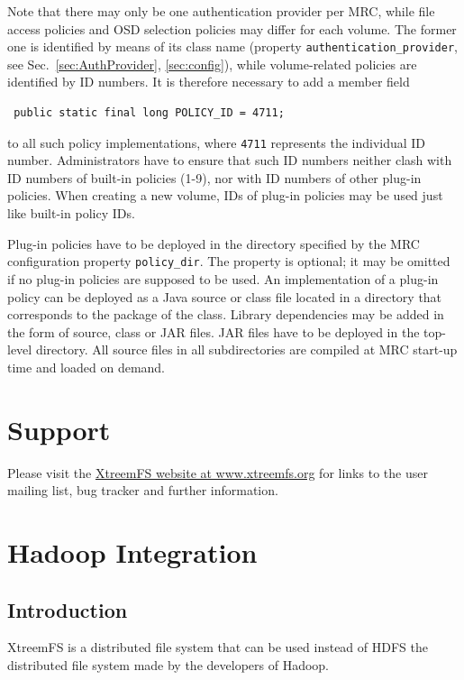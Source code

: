 \documentclass[a4paper,10pt]{book}
\begin{document}
Note that there may only be one authentication provider per MRC, while file access policies and OSD selection policies may differ for each volume. The former one is identified by means of its class name (property \texttt{authentication\_provider}, see Sec.\ \ref{sec:AuthProvider}, \ref{sec:config}), while volume-related policies are identified by ID numbers. It is therefore necessary to add a member field

\begin{verbatim}
 public static final long POLICY_ID = 4711;
\end{verbatim}

to all such policy implementations, where \texttt{4711} represents the individual ID number. Administrators have to ensure that such ID numbers neither clash with ID numbers of built-in policies (1-9), nor with ID numbers of other plug-in policies. When creating a new volume, IDs of plug-in policies may be used just like built-in policy IDs.

Plug-in policies have to be deployed in the directory specified by the MRC configuration property \texttt{policy\_dir}. The property is optional; it may be omitted if no plug-in policies are supposed to be used. An implementation of a plug-in policy can be deployed as a Java source or class file located in a directory that corresponds to the package of the class. Library dependencies may be added in the form of source, class or JAR files. JAR files have to be deployed in the top-level directory. All source files in all subdirectories are compiled at MRC start-up time and loaded on demand.

\appendix

\chapter{Support}
Please visit the \href{http://www.xtreemfs.org}{XtreemFS website at www.xtreemfs.org} for links to the user mailing list, bug tracker and further information.


\chapter{Hadoop Integration}

\section{Introduction}
\label{sec:hadoop_integration}

XtreemFS is a distributed file system that can be used instead of HDFS the distributed file system made by the developers of Hadoop.
\end{document}
